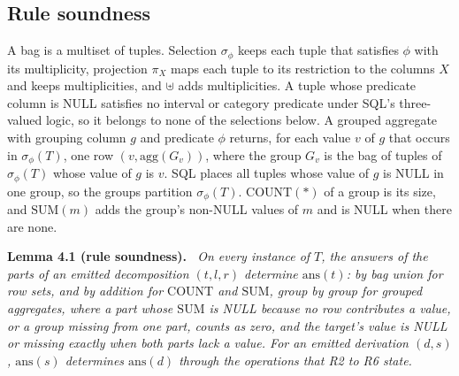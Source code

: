 \documentclass[10pt]{article}
\newcommand{\ans}{\mathrm{ans}}
\newenvironment{paperstatement}[1]{\par\medskip\noindent\textbf{#1.}\itshape\ }{\par\medskip}
\begin{document}
\subsection{Rule soundness}
A bag is a multiset of tuples. Selection $\sigma_\phi$ keeps each tuple that satisfies $\phi$ with its multiplicity, projection $\pi_X$ maps each tuple to its restriction to the columns $X$ and keeps multiplicities, and $\uplus$ adds multiplicities. A tuple whose predicate column is NULL satisfies no interval or category predicate under SQL's three-valued logic, so it belongs to none of the selections below. A grouped aggregate with grouping column $g$ and predicate $\phi$ returns, for each value $v$ of $g$ that occurs in $\sigma_\phi(T)$, one row $(v, \mathrm{agg}(G_v))$, where the group $G_v$ is the bag of tuples of $\sigma_\phi(T)$ whose value of $g$ is $v$. SQL places all tuples whose value of $g$ is NULL in one group, so the groups partition $\sigma_\phi(T)$. $\mathrm{COUNT}(*)$ of a group is its size, and $\mathrm{SUM}(m)$ adds the group's non-NULL values of $m$ and is NULL when there are none.

\begin{paperstatement}{Lemma 4.1 (rule soundness)}
On every instance of $T$, the answers of the parts of an emitted decomposition $(t,l,r)$ determine $\ans(t)$: by bag union for row sets, and by addition for $\mathrm{COUNT}$ and $\mathrm{SUM}$, group by group for grouped aggregates, where a part whose $\mathrm{SUM}$ is NULL because no row contributes a value, or a group missing from one part, counts as zero, and the target's value is NULL or missing exactly when both parts lack a value. For an emitted derivation $(d,s)$, $\ans(s)$ determines $\ans(d)$ through the operations that R2 to R6 state.
\end{paperstatement}
\end{document}
